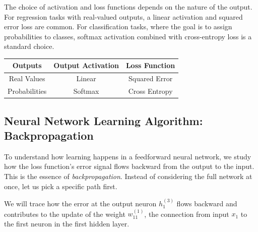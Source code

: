 The choice of activation and loss functions depends on the nature of the output. For regression tasks with real-valued outputs, a linear activation and squared error loss are common. For classification tasks, where the goal is to assign probabilities to classes, softmax activation combined with cross-entropy loss is a standard choice.

\begin{center}
\begin{tabular}{|c|c|c|}
    \hline
    \textbf{Outputs} & \textbf{Output Activation} & \textbf{Loss Function} \\
    \hline
    Real Values & Linear & Squared Error \\
    Probabilities & Softmax & Cross Entropy \\
    \hline
\end{tabular}
\end{center}


\subsection{Neural Network Learning Algorithm: Backpropagation}

To understand how learning happens in a feedforward neural network, we study how the loss function's error signal flows backward from the output to the input. This is the essence of \textit{backpropagation}. Instead of considering the full network at once, let us pick a specific path first. 

We will trace how the error at the output neuron \( h_1^{(3)} \) flows backward and contributes to the update of the weight \( w_{11}^{(1)} \), the connection from input \( x_1 \) to the first neuron in the first hidden layer.

